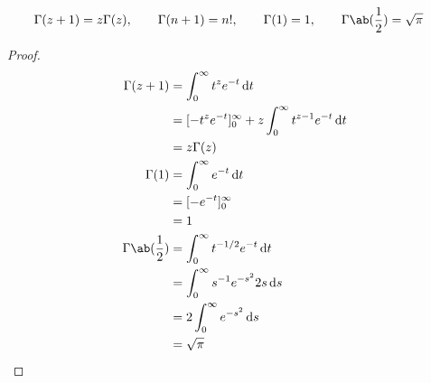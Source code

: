 \documentclass[uplatex,diffipdfmx,a4paper,11pt]{jlreq}
\begin{document}
\begin{proposition}
  \begin{align}
    \Gamma(z + 1) & = z\Gamma(z), \qquad \Gamma(n + 1) = n!, \qquad \Gamma(1) = 1, \qquad \Gamma\ab(\frac{1}{2}) = \sqrt{\pi}
  \end{align}
\end{proposition}
\begin{proof}
  \begin{align}
    \Gamma(z + 1)          & = \int_0^\infty t^{z}e^{-t}\dl{t}                              \\
                           & = [-t^{z}e^{-t}]_0^\infty + z\int_0^\infty t^{z-1}e^{-t}\dl{t} \\
                           & = z\Gamma(z)                                                   \\
    \Gamma(1)              & = \int_0^\infty e^{-t}\dl{t}                                   \\
                           & = [-e^{-t}]_0^\infty                                           \\
                           & = 1                                                            \\
    \Gamma\ab(\frac{1}{2}) & = \int_0^\infty t^{-1/2}e^{-t}\dl{t}                           \\
                           & = \int_0^\infty s^{-1}e^{-s^2}2s\dl{s}                         \\
                           & = 2\int_0^\infty e^{-s^2}\dl{s}                                \\
                           & = \sqrt{\pi}
  \end{align}
\end{proof}
\end{document}
